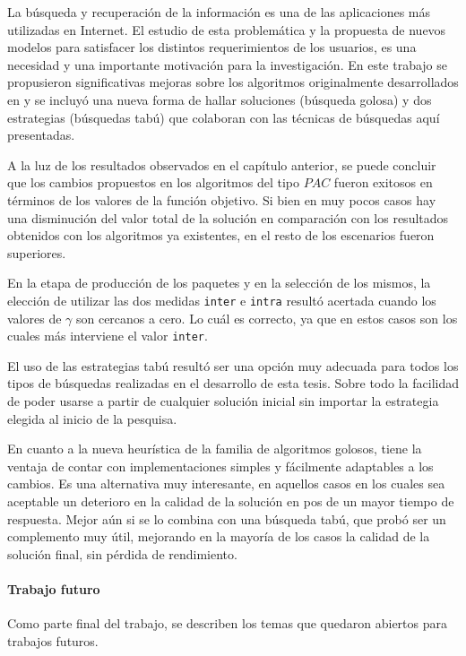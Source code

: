 La búsqueda y recuperación de la información es una de las aplicaciones más utilizadas en Internet. El estudio de esta problemática y la propuesta de nuevos modelos para satisfacer los distintos requerimientos de los usuarios, es una necesidad y una importante motivación para la investigación. En este trabajo se propusieron significativas mejoras sobre los algoritmos originalmente desarrollados en \cite{journals/tkde/Amer-YahiaBCFMZ14} y se incluyó una nueva forma de hallar soluciones (búsqueda golosa) y dos estrategias (búsquedas tabú) que colaboran con las técnicas de búsquedas aquí presentadas.

A la luz de los resultados observados en el capítulo anterior, se puede concluir que los cambios propuestos en los algoritmos del tipo $PAC$ fueron exitosos en términos de los valores de la función objetivo. Si bien en muy pocos casos hay una disminución del valor total de la solución en comparación con los resultados obtenidos con los algoritmos ya existentes, en el resto de los escenarios fueron superiores. 

En la etapa de producción de los paquetes y en la selección de los mismos, la elección de utilizar las dos medidas \texttt{inter} e \texttt{intra} resultó acertada cuando los valores de $\gamma$ son cercanos a cero. Lo cuál es correcto, ya que en estos casos son los cuales más interviene el valor \texttt{inter}.

El uso de las estrategias tabú resultó ser una opción muy adecuada para todos los tipos de búsquedas realizadas en el desarrollo de esta tesis. Sobre todo la facilidad de poder usarse a partir de cualquier solución inicial sin importar la estrategia elegida al inicio de la pesquisa.

En cuanto a la nueva heurística de la familia de algoritmos golosos, tiene la ventaja de contar con implementaciones simples y fácilmente adaptables a los cambios. Es una alternativa muy interesante, en aquellos casos en los cuales sea aceptable un deterioro en la calidad de la solución en pos de un mayor tiempo de respuesta. Mejor aún si se lo combina con una búsqueda tabú, que probó ser un complemento muy útil, mejorando en la mayoría de los casos la calidad de la solución final, sin pérdida de rendimiento. 

\paragraph{Trabajo futuro} Como parte final del trabajo, se describen los temas que quedaron abiertos para trabajos futuros. 

